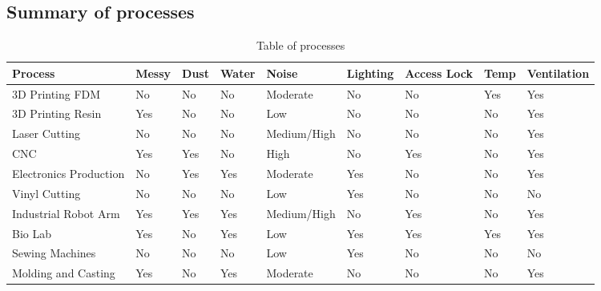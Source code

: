 \documentclass[a4paper,12pt,titlepage]{article}
\begin{document}
\begin{landscape}
\subsection{Summary of processes}
\begin{table}[h]
\centering
\begin{tabular}{@{}lllllllll@{}}
\toprule
Process                & Messy & Dust & Water & Noise       & Lighting & Access Lock & Temp & Ventilation \\ \midrule
3D Printing FDM        & No    & No   & No    & Moderate    & No       & No          & Yes           & Yes \\
3D Printing Resin      & Yes   & No   & No    & Low         & No       & No          & No            & Yes         \\
Laser Cutting          & No    & No   & No    & Medium/High & No       & No          & No            & Yes         \\
CNC                    & Yes   & Yes  & No    & High        & No       & Yes         & No            & Yes         \\
Electronics Production & No    & Yes  & Yes   & Moderate    & Yes      & No          & No            & Yes         \\
Vinyl Cutting          & No    & No   & No    & Low         & Yes      & No          & No            & No          \\
Industrial Robot Arm   & Yes   & Yes  & Yes   & Medium/High & No       & Yes         & No            & Yes         \\
Bio Lab                & Yes   & No   & Yes   & Low         & Yes      & Yes         & Yes           & Yes         \\
Sewing Machines        & No    & No   & No    & Low         & Yes      & No          & No            & No          \\
Molding and Casting    & Yes   & No   & Yes   & Moderate    & No       & No          & No            & Yes         \\ \bottomrule
\end{tabular}
\caption{Table of processes}
\label{processes}
\end{table}
\end{landscape}
\end{document}
